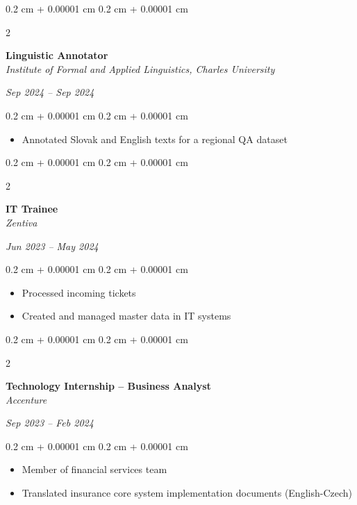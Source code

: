 \documentclass[10pt, letterpaper]{article}
\newenvironment{highlights}{
    \begin{itemize}[
        topsep=0.10 cm,
        parsep=0.10 cm,
        partopsep=0pt,
        itemsep=0pt,
        leftmargin=0.4 cm + 10pt
    ]
}{
    \end{itemize}
} %
\newenvironment{onecolentry}{
    \begin{adjustwidth}{
        0.2 cm + 0.00001 cm
    }{
        0.2 cm + 0.00001 cm
    }
}{
    \end{adjustwidth}
} %
\newenvironment{twocolentry}[2][]{
    \onecolentry
    \def\secondColumn{#2}
    \setcolumnwidth{\fill, 4.5 cm}
    \begin{paracol}{2}
}{
    \switchcolumn \raggedleft \secondColumn
    \end{paracol}
    \endonecolentry
} %
\begin{document}
        \vspace{0.2 cm}
        \begin{twocolentry}{\textit{Sep 2024 – Sep 2024}}
            \textbf{Linguistic Annotator}  \\
            \textit{Institute of Formal and Applied Linguistics, Charles University}
        \end{twocolentry}
        
        \vspace{0.10 cm}
        \begin{onecolentry}
            \begin{highlights}
                \item Annotated Slovak and English texts for a regional QA dataset
            \end{highlights}
        \end{onecolentry}
        
        \vspace{0.2 cm}
        \begin{twocolentry}{\textit{Jun 2023 – May 2024}}
            \textbf{IT Trainee}  \\
            \textit{Zentiva}
        \end{twocolentry}
        
        \vspace{0.10 cm}
        \begin{onecolentry}
            \begin{highlights}
                \item Processed incoming tickets
                \item Created and managed master data in IT systems
            \end{highlights}
        \end{onecolentry}
        
        \vspace{0.2 cm}
        \begin{twocolentry}{\textit{Sep 2023 – Feb 2024}}
            \textbf{Technology Internship – Business Analyst}  \\
            \textit{Accenture}
        \end{twocolentry}
        
        \vspace{0.10 cm}
        \begin{onecolentry}
            \begin{highlights}
                \item Member of financial services team
                \item Translated insurance core system implementation documents (English-Czech)
            \end{highlights}
        \end{onecolentry}
        
\end{document}
